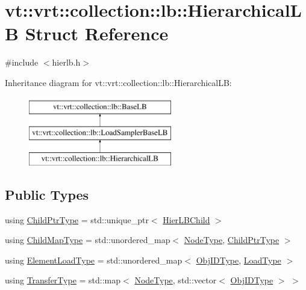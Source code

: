 \hypertarget{structvt_1_1vrt_1_1collection_1_1lb_1_1_hierarchical_l_b}{}\section{vt\+:\+:vrt\+:\+:collection\+:\+:lb\+:\+:Hierarchical\+LB Struct Reference}
\label{structvt_1_1vrt_1_1collection_1_1lb_1_1_hierarchical_l_b}


{\ttfamily \#include $<$hierlb.\+h$>$}

Inheritance diagram for vt\+:\+:vrt\+:\+:collection\+:\+:lb\+:\+:Hierarchical\+LB\+:\begin{figure}[H]
\begin{center}
\leavevmode
\includegraphics[height=3.000000cm]{structvt_1_1vrt_1_1collection_1_1lb_1_1_hierarchical_l_b}
\end{center}
\end{figure}
\subsection*{Public Types}
\begin{DoxyCompactItemize}
\item 
using \hyperlink{structvt_1_1vrt_1_1collection_1_1lb_1_1_hierarchical_l_b_a4dd8525145427a29350a287a777655de}{Child\+Ptr\+Type} = std\+::unique\+\_\+ptr$<$ \hyperlink{structvt_1_1vrt_1_1collection_1_1lb_1_1_hier_l_b_child}{Hier\+L\+B\+Child} $>$
\item 
using \hyperlink{structvt_1_1vrt_1_1collection_1_1lb_1_1_hierarchical_l_b_a95e5a93033703216cad8ec7a3da7a2ef}{Child\+Map\+Type} = std\+::unordered\+\_\+map$<$ \hyperlink{namespacevt_a866da9d0efc19c0a1ce79e9e492f47e2}{Node\+Type}, \hyperlink{structvt_1_1vrt_1_1collection_1_1lb_1_1_hierarchical_l_b_a4dd8525145427a29350a287a777655de}{Child\+Ptr\+Type} $>$
\item 
using \hyperlink{structvt_1_1vrt_1_1collection_1_1lb_1_1_hierarchical_l_b_a6ef136674a2f2709b91ebaade73eff68}{Element\+Load\+Type} = std\+::unordered\+\_\+map$<$ \hyperlink{structvt_1_1vrt_1_1collection_1_1lb_1_1_base_l_b_a790b22acf448880599724749cdc4e9b3}{Obj\+I\+D\+Type}, \hyperlink{namespacevt_a8fb51741340b87d7aaee0bef60e9896b}{Load\+Type} $>$
\item 
using \hyperlink{structvt_1_1vrt_1_1collection_1_1lb_1_1_hierarchical_l_b_a83550b541c35c8a1cc0c97779d1c8184}{Transfer\+Type} = std\+::map$<$ \hyperlink{namespacevt_a866da9d0efc19c0a1ce79e9e492f47e2}{Node\+Type}, std\+::vector$<$ \hyperlink{structvt_1_1vrt_1_1collection_1_1lb_1_1_base_l_b_a790b22acf448880599724749cdc4e9b3}{Obj\+I\+D\+Type} $>$ $>$
\end{DoxyCompactItemize}
